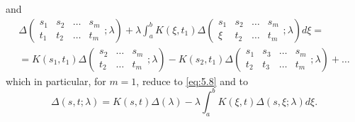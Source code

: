 \documentclass[12pt,a4paper,leqno,twoside]{extbook}
\begin{document}
and
\begin{equation}
    \label{eq:5.15}
    \begin{gathered}
        \Delta
        \left(
        \begin{matrix}
            s_1 & s_2 & \ldots & s_m \\
            t_1 & t_2 & \ldots & t_m
        \end{matrix}
        ; \lambda
        \right)
        + \lambda \int_a^b K(\xi, t_1) \Delta
        \left(
        \begin{matrix}
            s_1 & s_2 & \ldots & s_m \\
            \xi & t_2 & \ldots & t_m
        \end{matrix}
        ; \lambda
        \right)
        d\xi = \\
        = K(s_1, t_1) \Delta
        \left(
        \begin{matrix}
            s_2 & \ldots & s_m \\
            t_2 & \ldots & t_m
        \end{matrix}
        ; \lambda
        \right)
        - K(s_2, t_1) \Delta
        \left(
        \begin{matrix}
            s_1 & s_3 & \ldots & s_m \\
            t_2 & t_3 & \ldots & t_m
        \end{matrix}
        ; \lambda
        \right)
        + \ldots
    \end{gathered}
\end{equation}
which in particular, for \(m = 1\), reduce to \eqref{eq:5.8} and to
\begin{equation}
    \label{eq:5.16}
    \Delta(s, t; \lambda) = K(s, t)\Delta(\lambda) - \lambda \int_a^b K(\xi, t) \Delta(s, \xi; \lambda) d\xi.
\end{equation}
\end{document}
